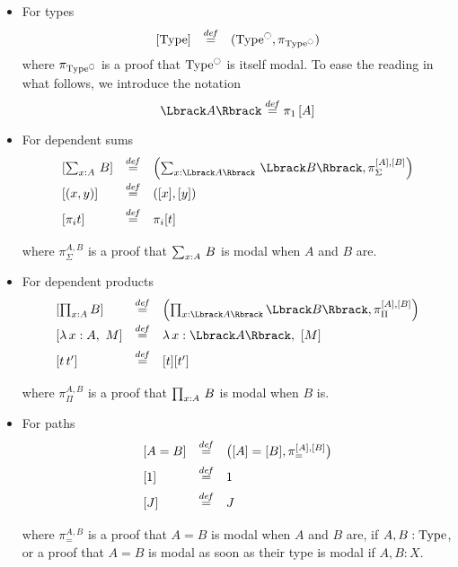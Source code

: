 \begin{itemize}
\item For types
\[
\begin{array}{lcl}
  \left[ \operatorname{Type}\right] &\overset{de\hspace{-0.2ex}f}{=}& (\operatorname{Type}^{\ocircle},\pi_{\operatorname{Type}^{\ocircle}})
\end{array}
\]
where $\pi_{\operatorname{Type}^{\ocircle}}$ is a proof that $\operatorname{Type}^{\ocircle}$ is itself
modal.
To ease the reading in what follows, we introduce the notation  \[ 
  \Lbrack A \Rbrack \defeq \pi_1 \left[ A \right]\]

\item For dependent sums
\[
\begin{array}{lcl}
\left[ \sumD x A B \right] &\defeq&  \left( \sumD x{\Lbrack A \Rbrack}
                                  {\Lbrack B\Rbrack} , \pi_\Sigma^{[A],[B]}
                                \right)\\[0.5em]
  \left[  (x,y)\right] &\defeq& ([x],[y]) \\[0.5em]
  \left[  \pi_i t\right] &\defeq& \pi_i [t] \\[0.5em]
\end{array}
\]
where $\pi_{\Sigma}^{A,B}$ is a proof that $\sum_{x:A}\, B$ is modal when
$A$ and $B$ are.
\item For dependent products
\[
\begin{array}{lcl}
 \left[ \prod_{x:A} B \right] &\defeq& \left( \prod_{x:\Lbrack A \Rbrack}
                                   \Lbrack B\Rbrack , \pi_{\Pi}^{[A],[B]}
                                  \right)\\[0.5em]
\left[  \lambda\, x:A,~M \right] &\defeq&\lambda\,x:\Lbrack A
                                     \Rbrack,~[ M ]
  \\[0.5em]
  \left[ t \, t' \right] &\defeq& [t] [t'] \\[0.5em]
\end{array}
\]
where $\pi_{\Pi}^{A,B}$ is a proof that $\prod_{x:A}\, B$ is modal when $B$ is.
\item For paths
\[
\begin{array}{lcl}
\left[  A=B \right] &\overset{de\hspace{-0.2ex}f}{=}& \left( [A] = [ B] , \pi_=^{[A],[B]}
                             \right)\\[0.5em]
\left[ 1 \right] &\overset{de\hspace{-0.2ex}f}{=}& 1\\[0.5em]
\left[ J \right] &\overset{de\hspace{-0.2ex}f}{=}& J \\[0.5em]
\end{array}
\]
where $\pi_{=}^{A,B}$ is a proof that $A=B$ is modal when
$A$ and $B$ are, if $A,B:\operatorname{Type}$, or a proof that $A=B$ is modal as
soon as their type is modal if $A,B:X$.

\end{itemize}
